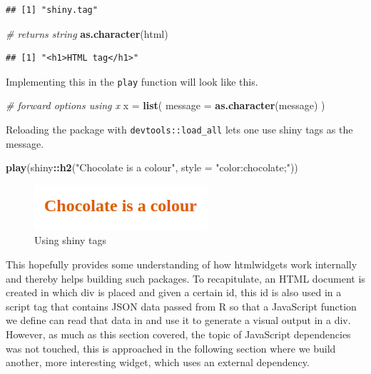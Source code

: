 \documentclass[
]{krantz}
\makeatletter
\newenvironment{Shaded}{\begin{snugshade}}{\end{snugshade}}
\newcommand{\CommentTok}[1]{\textcolor[rgb]{0.37,0.37,0.37}{\textit{#1}}}
\newcommand{\DataTypeTok}[1]{\textcolor[rgb]{0.27,0.27,0.27}{#1}}
\newcommand{\KeywordTok}[1]{\textcolor[rgb]{0.27,0.27,0.27}{\textbf{#1}}}
\newcommand{\NormalTok}[1]{#1}
\newcommand{\OperatorTok}[1]{\textcolor[rgb]{0.43,0.43,0.43}{\textbf{#1}}}
\newcommand{\StringTok}[1]{\textcolor[rgb]{0.5,0.5,0.5}{#1}}
\newenvironment{kframe}{%
\medskip{}
\setlength{\fboxsep}{.8em}
 \def\at@end@of@kframe{}%
 \ifinner\ifhmode%
  \def\at@end@of@kframe{\end{minipage}}%
  \begin{minipage}{\columnwidth}%
 \fi\fi%
 \def\FrameCommand##1{\hskip\@totalleftmargin \hskip-\fboxsep
 \colorbox{shadecolor}{##1}\hskip-\fboxsep
     \hskip-\linewidth \hskip-\@totalleftmargin \hskip\columnwidth}%
 \MakeFramed {\advance\hsize-\width
   \@totalleftmargin\z@ \linewidth\hsize
   \@setminipage}}%
 {\par\unskip\endMakeFramed%
 \at@end@of@kframe}
\renewenvironment{Shaded}{\begin{kframe}}{\end{kframe}}
\makeatother
\begin{document}
\begin{verbatim}
## [1] "shiny.tag"
\end{verbatim}

\begin{Shaded}
\begin{Highlighting}[]
\CommentTok{\# returns string}
\KeywordTok{as.character}\NormalTok{(html)}
\end{Highlighting}
\end{Shaded}

\begin{verbatim}
## [1] "<h1>HTML tag</h1>"
\end{verbatim}

Implementing this in the \texttt{play} function will look like this.

\begin{Shaded}
\begin{Highlighting}[]
\CommentTok{\# forward options using x}
\NormalTok{x =}\StringTok{ }\KeywordTok{list}\NormalTok{(}
  \DataTypeTok{message =} \KeywordTok{as.character}\NormalTok{(message)}
\NormalTok{)}
\end{Highlighting}
\end{Shaded}

Reloading the package with \texttt{devtools::load\_all} lets one use shiny tags as the message.

\begin{Shaded}
\begin{Highlighting}[]
\KeywordTok{play}\NormalTok{(shiny}\OperatorTok{::}\KeywordTok{h2}\NormalTok{(}\StringTok{"Chocolate is a colour"}\NormalTok{, }\DataTypeTok{style =} \StringTok{"color:chocolate;"}\NormalTok{))}
\end{Highlighting}
\end{Shaded}

\begin{figure}
\centering
\includegraphics{images/playground-color.png}
\caption{Using shiny tags}
\end{figure}

This hopefully provides some understanding of how htmlwidgets work internally and thereby helps building such packages. To recapitulate, an HTML document is created in which div is placed and given a certain id, this id is also used in a script tag that contains JSON data passed from R so that a JavaScript function we define can read that data in and use it to generate a visual output in a div. However, as much as this section covered, the topic of JavaScript dependencies was not touched, this is approached in the following section where we build another, more interesting widget, which uses an external dependency.
\end{document}
